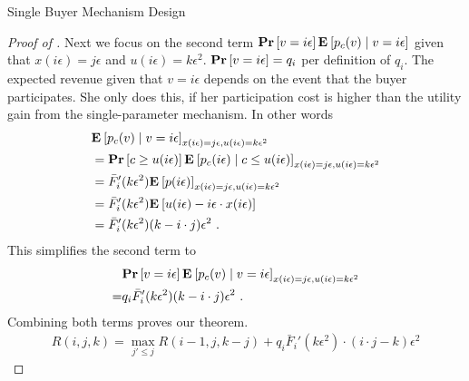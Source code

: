 \documentclass[11pt,a4paper]{article}
\renewcommand{\Pr}[1]{\mbox{\rm\bf Pr}\left[#1\right]}
\newcommand{\Ex}[2][]{\mbox{\rm\bf E}_{#1}\left[#2\right]}
\newcommand{\1}[1]{\mbox{\rm\bf 1}_{#1}}
\newcommand{\eqdot}{\text{ .}}
\begin{document}
\begin{section}{Single Buyer Mechanism Design}
\begin{proof}[Proof of ]
     Next we focus on the second term $\Pr{v = i \epsilon} \Ex{p_c(v) \mid v = i \epsilon}$ given that $x(i\epsilon) = j\epsilon$ and $u(i\epsilon) = k\epsilon^2$.
     $\Pr{v = i \epsilon} = q_i$ per definition of $q_i$.
     The expected revenue given that $v = i \epsilon$ depends on the event that the buyer participates.
     She only does this, if her participation cost is higher than the utility gain from the single-parameter mechanism.
     In other words
     \begin{align*}
          & \Ex{p_c(v) \mid v = i \epsilon}_{x(i\epsilon) = j \epsilon, u(i\epsilon) = k\epsilon^2}                                         \\
          & = \Pr{c \geq u(i\epsilon)} \Ex{p_c(i\epsilon) \mid c \leq u(i\epsilon)}_{x(i\epsilon) = j \epsilon, u(i\epsilon) = k\epsilon^2} \\
          & = \bar{F}_i'(k\epsilon^2) \Ex{p(i\epsilon)}_{x(i\epsilon) = j \epsilon, u(i\epsilon) = k\epsilon^2}                             \\
          & = \bar{F}_i'(k\epsilon^2) \Ex{u(i\epsilon) - i\epsilon \cdot x(i\epsilon)}                                                      \\
          & = \bar{F}_i'(k\epsilon^2) (k - i \cdot j)\epsilon^2 \eqdot
     \end{align*}
     This simplifies the second term to
     \begin{align*}
           & \Pr{v = i \epsilon} \Ex{p_c(v) \mid v = i \epsilon}_{x(i\epsilon) = j \epsilon, u(i\epsilon) = k\epsilon^2} \\
         = & q_i \bar{F}_i'(k\epsilon^2) (k - i \cdot j)\epsilon^2 \eqdot
     \end{align*}
     Combining both terms proves our theorem.
     \begin{align*}
         R(i,j,k) = \max_{j' \leq j} R(i-1, j, k - j) + q_i \bar{F}_i'(k \epsilon^2) \cdot (i\cdot j - k)\epsilon^2
     \end{align*}
 \end{proof}


\end{section}
\end{document}
